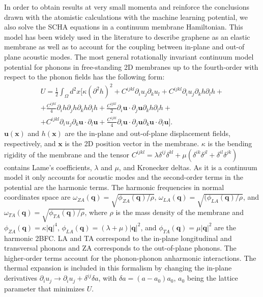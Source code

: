In order to obtain results at very small momenta and reinforce the conclusions drawn with the atomistic calculations 
with the machine learning potential, we also solve the SCHA equations in a continuum membrane Hamiltonian. This model 
has been widely used in the literature to describe graphene as an elastic membrane as well as to account for the 
coupling between in-plane and out-of plane acoustic 
modes\cite{mariani2008flexural,amorim2014thermodynamics,de2012bending}. The most general rotationally invariant 
continuum model potential for phonons in free-standing 2D membranes up to the fourth-order with respect to the 
phonon fields has the following form:
\begin{multline}
 \label{membrane-potential}
 U=\frac{1}{2}\int_{\Omega}d^{2}x[\kappa(\partial^{2}h)^{2}+C^{ijkl}\partial_{i}u_{j}\partial_{k}u_{l}+C^{ijkl}\partial_{i}u_{j}\partial_{k}h\partial_{l}h+\\ +\frac{C^{ijkl}}{4}\partial_{i}h\partial_{j}h\partial_{
 k}h\partial_{l}h+\frac{C^{ijkl}}{2}\partial_{i}\boldsymbol{u}\cdot\partial_{j}\boldsymbol{u}\partial_{k}h\partial_{l}h+\\+C^{ijkl}\partial_{i}u_{j}\partial_{k}\boldsymbol{u}\cdot\partial_{l}\boldsymbol{u}+
 \frac{C^{ijkl}}{4}\partial_{i}\boldsymbol{u}\cdot\partial_{j}\boldsymbol{u}\partial_{k}\boldsymbol{u}\cdot\partial_{l}\boldsymbol{u}].
\end{multline}
$\boldsymbol{u}(\boldsymbol{x})$ and $h(\boldsymbol{x})$ are the in-plane and out-of-plane displacement 
fields, respectively, and $\boldsymbol{x}$ is the 2D position vector in the membrane. $\kappa$ is the bending 
rigidity of the membrane and the tensor 
$C^{ijkl}=\lambda\delta^{ij}\delta^{kl}+\mu(\delta^{ik}\delta^{jl}+\delta^{il}\delta^{jk})$ contains Lame's 
coefficients, $\lambda$ and $\mu$, and Kronecker deltas. As it is a continuum model it only accounts for acoustic 
modes and the second-order terms in the potential are the harmonic terms. The harmonic frequencies in normal 
coordinates space are $\omega_{ZA}(\boldsymbol{q})=\sqrt{\phi_{ZA}(\boldsymbol{q})/\rho}$, 
$\omega_{LA}(\boldsymbol{q})=\sqrt{(\phi_{LA}(\boldsymbol{q})/\rho}$, and 
$\omega_{TA}(\boldsymbol{q})=\sqrt{\phi_{TA}(\boldsymbol{q})/\rho}$, where $\rho$ is the mass density of the membrane 
and $\phi_{ZA}(\boldsymbol{q})=\kappa |\boldsymbol{q}|^{4}$, 
$\phi_{LA}(\boldsymbol{q})=(\lambda+\mu)|\boldsymbol{q}|^{2}$, and
$\phi_{TA}(\boldsymbol{q})=\mu|\boldsymbol{q}|^{2}$ are the harmonic 2BFC. LA and TA correspond to the in-plane 
longitudinal and transversal phonons and ZA corresponds to the out-of-plane phonons. The higher-order terms account 
for the phonon-phonon anharmonic interactions. The thermal expansion is included in this formalism by changing the 
in-plane derivatives $\partial_{i}u_{j}\rightarrow \partial_{i}u_{j}+\delta^{ij}\delta a$, with 
$\delta a=(a-a_{0})a_{0}$, $a_{0}$ being the lattice parameter that minimizes $U$. \\

